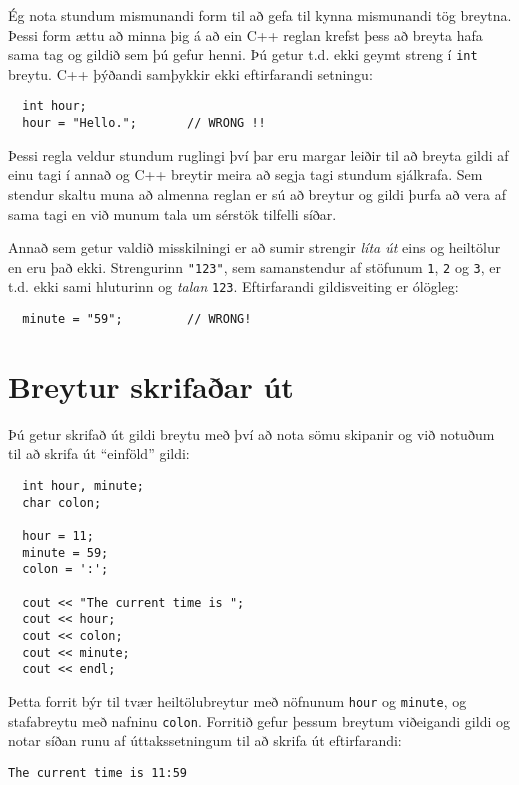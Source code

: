 \vspace{0.1in}
\centerline{}
\vspace{0.1in}

Ég nota stundum mismunandi form til að gefa til kynna mismunandi tög breytna.
Þessi form ættu að minna þig á að ein C++ reglan krefst þess að breyta hafa sama tag og gildið sem þú gefur henni.
Þú getur t.d. ekki geymt streng í {\tt int} breytu.
C++ þýðandi samþykkir ekki eftirfarandi setningu: 

\begin{verbatim}
  int hour;
  hour = "Hello.";       // WRONG !!
\end{verbatim}
%
Þessi regla veldur stundum ruglingi því þar eru margar leiðir til að breyta gildi af einu tagi í annað og C++ breytir meira að segja tagi stundum sjálkrafa.
Sem stendur skaltu muna að almenna reglan er sú að breytur og gildi þurfa að vera af sama tagi en við munum tala um sérstök tilfelli síðar.

Annað sem getur valdið misskilningi er að sumir strengir {\em líta út} eins og heiltölur en eru það ekki.
Strengurinn \verb+"123"+, sem samanstendur af stöfunum {\tt 1}, {\tt 2} og {\tt 3}, er t.d. ekki sami hluturinn og {\em talan} {\tt 123}.
Eftirfarandi gildisveiting er ólögleg:

\begin{verbatim}
  minute = "59";         // WRONG!
\end{verbatim}
%
\section{Breytur skrifaðar út}
\label{output}

Þú getur skrifað út gildi breytu með því að nota sömu skipanir og við notuðum til að skrifa út ``einföld'' gildi:

\begin{verbatim}
  int hour, minute;
  char colon;

  hour = 11;
  minute = 59;
  colon = ':';

  cout << "The current time is ";
  cout << hour;
  cout << colon;
  cout << minute;
  cout << endl;
\end{verbatim}
%
Þetta forrit býr til tvær heiltölubreytur með nöfnunum {\tt hour} og {\tt minute}, og stafabreytu með nafninu {\tt colon}.
Forritið gefur þessum breytum viðeigandi gildi og notar síðan runu af úttakssetningum til að skrifa út eftirfarandi: 

\begin{verbatim}
The current time is 11:59
\end{verbatim}

